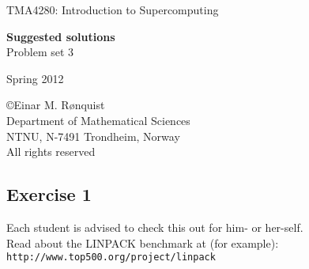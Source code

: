 \documentclass[11pt]{article}
\begin{document}
 
\LARGE
\begin{center}
TMA4280: Introduction to Supercomputing
\end{center}
\vspace{1in}

\begin{center}
{\bf Suggested solutions} \\
Problem set 3
\end{center}

\Large
\vspace{0.5in}
\begin{center}
Spring 2012
\end{center}

\vspace{0.5in}

\begin{center}
\copyright Einar M. R{\o}nquist \\
Department of Mathematical Sciences\\
NTNU, N-7491 Trondheim, Norway\\
All rights reserved
\end{center}

\large

\newpage

\subsection*{Exercise 1}
Each student is advised to check this out for him- or her-self. \\

Read about the LINPACK benchmark at (for example):\\
\texttt{http://www.top500.org/project/linpack}
\end{document}
